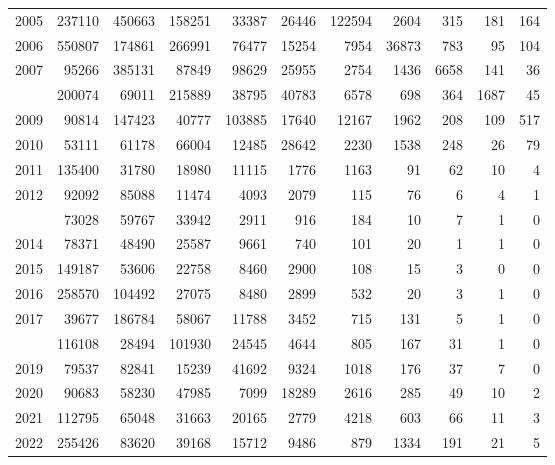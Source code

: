 \documentclass[
]{article}
\begin{document}
\begin{longtable}[t]{lrrrrrrrrrr}
2005 & 237110 & 450663 & 158251 & 33387 & 26446 & 122594 & 2604 & 315 & 181 & 164\\
2006 & 550807 & 174861 & 266991 & 76477 & 15254 & 7954 & 36873 & 783 & 95 & 104\\
2007 & 95266 & 385131 & 87849 & 98629 & 25955 & 2754 & 1436 & 6658 & 141 & 36\\
\addlinespace
2008 & 200074 & 69011 & 215889 & 38795 & 40783 & 6578 & 698 & 364 & 1687 & 45\\
2009 & 90814 & 147423 & 40777 & 103885 & 17640 & 12167 & 1962 & 208 & 109 & 517\\
2010 & 53111 & 61178 & 66004 & 12485 & 28642 & 2230 & 1538 & 248 & 26 & 79\\
2011 & 135400 & 31780 & 18980 & 11115 & 1776 & 1163 & 91 & 62 & 10 & 4\\
2012 & 92092 & 85088 & 11474 & 4093 & 2079 & 115 & 76 & 6 & 4 & 1\\
\addlinespace
2013 & 73028 & 59767 & 33942 & 2911 & 916 & 184 & 10 & 7 & 1 & 0\\
2014 & 78371 & 48490 & 25587 & 9661 & 740 & 101 & 20 & 1 & 1 & 0\\
2015 & 149187 & 53606 & 22758 & 8460 & 2900 & 108 & 15 & 3 & 0 & 0\\
2016 & 258570 & 104492 & 27075 & 8480 & 2899 & 532 & 20 & 3 & 1 & 0\\
2017 & 39677 & 186784 & 58067 & 11788 & 3452 & 715 & 131 & 5 & 1 & 0\\
\addlinespace
2018 & 116108 & 28494 & 101930 & 24545 & 4644 & 805 & 167 & 31 & 1 & 0\\
2019 & 79537 & 82841 & 15239 & 41692 & 9324 & 1018 & 176 & 37 & 7 & 0\\
2020 & 90683 & 58230 & 47985 & 7099 & 18289 & 2616 & 285 & 49 & 10 & 2\\
2021 & 112795 & 65048 & 31663 & 20165 & 2779 & 4218 & 603 & 66 & 11 & 3\\
2022 & 255426 & 83620 & 39168 & 15712 & 9486 & 879 & 1334 & 191 & 21 & 5\\*
\end{longtable}
\end{document}
